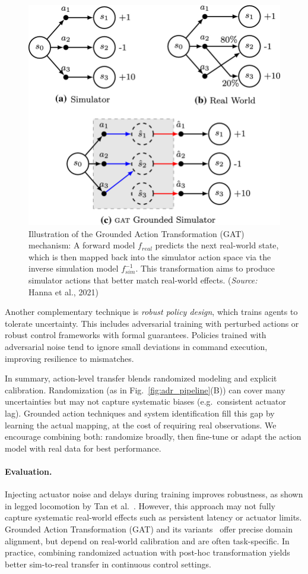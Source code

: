 \begin{figure}[H]
    \centering
    \includegraphics[width=0.95\linewidth]{figures/figGATMechanism.png}
    \caption{Illustration of the Grounded Action Transformation (GAT) mechanism: A forward model $f_{real}$ predicts the next real-world state, which is then mapped back into the simulator action space via the inverse simulation model $f_{sim}^{-1}$. This transformation aims to produce simulator actions that better match real-world effects. (\emph{Source:} Hanna et al., 2021)}
    \label{fig:gat_mechanism}
\end{figure}

Another complementary technique is \textit{robust policy design}, which trains agents to tolerate uncertainty. This includes adversarial training with perturbed actions or robust control frameworks with formal guarantees. Policies trained with adversarial noise tend to ignore small deviations in command execution, improving resilience to mismatches.

In summary, action-level transfer blends randomized modeling and explicit calibration. Randomization (as in Fig.~\ref{fig:adr_pipeline}(B)) can cover many uncertainties but may not capture systematic biases (e.g.\ consistent actuator lag). Grounded action techniques and system identification fill this gap by learning the actual mapping, at the cost of requiring real observations. We encourage combining both: randomize broadly, then fine-tune or adapt the action model with real data for best performance.

\paragraph{Evaluation.} Injecting actuator noise and delays during training improves robustness, as shown in legged locomotion by Tan et al.~\cite{Tan2018}. However, this approach may not fully capture systematic real-world effects such as persistent latency or actuator limits. Grounded Action Transformation (GAT) and its variants~\cite{Hanna2017, Desai2020} offer precise domain alignment, but depend on real-world calibration and are often task-specific. In practice, combining randomized actuation with post-hoc transformation yields better sim-to-real transfer in continuous control settings.